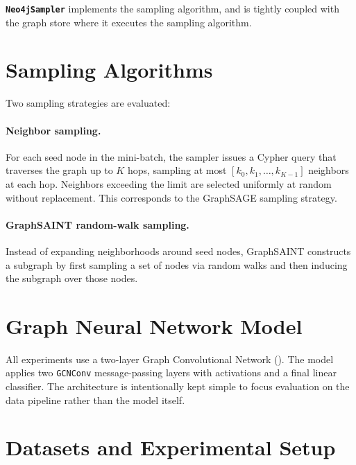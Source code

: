 \noindent \textbf{\texttt{Neo4jSampler}} implements the sampling algorithm, and is tightly coupled
with the graph store where it executes the sampling algorithm.

\section{Sampling Algorithms}\label{sec:sampling_algs}

Two sampling strategies are evaluated:

\paragraph{Neighbor sampling.} For each seed node in the mini-batch, the sampler
issues a Cypher query that traverses the graph up to $K$ hops, sampling at most
$[k_0, k_1, \ldots, k_{K-1}]$ neighbors at each hop. Neighbors exceeding the limit
are selected uniformly at random without replacement. This corresponds to the GraphSAGE
sampling strategy.

\paragraph{GraphSAINT random-walk sampling.} Instead of expanding neighborhoods
around seed nodes, GraphSAINT constructs a subgraph by first sampling a set of nodes
via random walks and then inducing the subgraph over those nodes.


\section{Graph Neural Network Model}\label{sec:model}

All experiments use a two-layer Graph Convolutional Network (). The
model applies two \texttt{GCNConv} message-passing layers with 
activations and a final linear classifier. The architecture is intentionally kept
simple to focus evaluation on the data pipeline rather than the model itself.


\section{Datasets and Experimental Setup}\label{sec:datasets}

